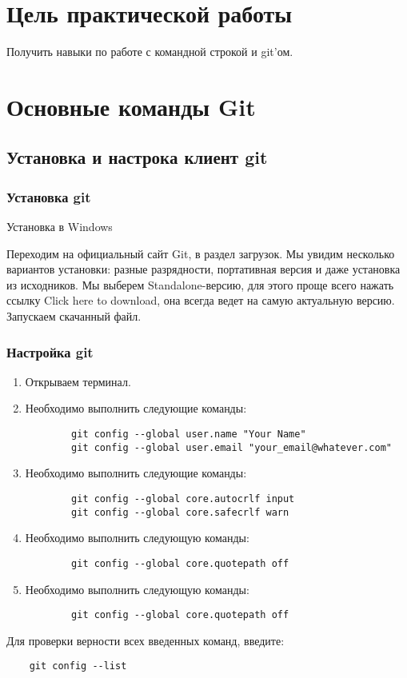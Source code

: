 \chapter*{\LARGE{Цель практической работы}}
Получить навыки по работе с командной строкой и git’ом.

\chapter{Основные команды Git}

\section{Установка и настрока клиент git}
\subsection{Установка git}
Установка в Windows\par
Переходим на официальный сайт Git, в раздел загрузок.
Мы увидим несколько вариантов установки: разные разрядности,
портативная версия и даже установка из исходников.
Мы выберем Standalone-версию, для этого проще всего нажать ссылку
Click here to download, она всегда ведет на самую актуальную версию.
Запускаем скачанный файл.\par

\subsection{Настройка git}
\begin{enumerate}
	\item Открываем терминал.
	\item Необходимо выполнить следующие команды:
	\begin{verbatim}
		git config --global user.name "Your Name"
		git config --global user.email "your_email@whatever.com"
	\end{verbatim}
	\item Необходимо выполнить следующие команды:
	\begin{verbatim}
		git config --global core.autocrlf input
		git config --global core.safecrlf warn
	\end{verbatim}
	\item Необходимо выполнить следующую команды:
	\begin{verbatim}
		git config --global core.quotepath off
	\end{verbatim}
	\item Необходимо выполнить следующую команды:
	\begin{verbatim}
		git config --global core.quotepath off
	\end{verbatim}
\end{enumerate}
Для проверки верности всех введенных команд, введите:
\begin{verbatim}
	git config --list
\end{verbatim}

